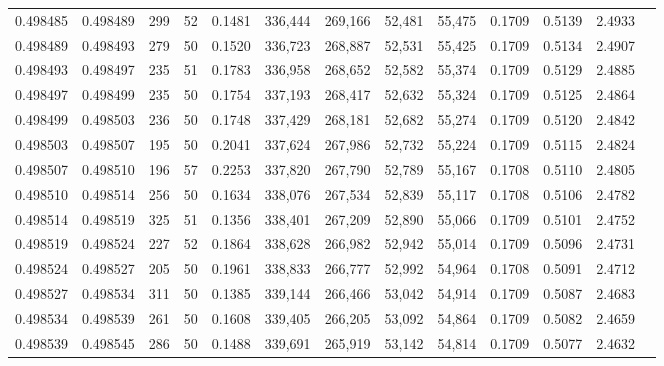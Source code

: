\begin{tabular}{rrrrrrrrrrrrr}
0.498485 & 0.498489 & 299 &  52 &                                     0.1481 & 336,444 & 269,166 &  52,481 &  55,475 & 0.1709 & 0.5139 & 2.4933 \\
0.498489 & 0.498493 & 279 &  50 &                                     0.1520 & 336,723 & 268,887 &  52,531 &  55,425 & 0.1709 & 0.5134 & 2.4907 \\
0.498493 & 0.498497 & 235 &  51 &                                     0.1783 & 336,958 & 268,652 &  52,582 &  55,374 & 0.1709 & 0.5129 & 2.4885 \\
0.498497 & 0.498499 & 235 &  50 &                                     0.1754 & 337,193 & 268,417 &  52,632 &  55,324 & 0.1709 & 0.5125 & 2.4864 \\
0.498499 & 0.498503 & 236 &  50 &                                     0.1748 & 337,429 & 268,181 &  52,682 &  55,274 & 0.1709 & 0.5120 & 2.4842 \\
0.498503 & 0.498507 & 195 &  50 &                                     0.2041 & 337,624 & 267,986 &  52,732 &  55,224 & 0.1709 & 0.5115 & 2.4824 \\
0.498507 & 0.498510 & 196 &  57 &                                     0.2253 & 337,820 & 267,790 &  52,789 &  55,167 & 0.1708 & 0.5110 & 2.4805 \\
0.498510 & 0.498514 & 256 &  50 &                                     0.1634 & 338,076 & 267,534 &  52,839 &  55,117 & 0.1708 & 0.5106 & 2.4782 \\
0.498514 & 0.498519 & 325 &  51 &                                     0.1356 & 338,401 & 267,209 &  52,890 &  55,066 & 0.1709 & 0.5101 & 2.4752 \\
0.498519 & 0.498524 & 227 &  52 &                                     0.1864 & 338,628 & 266,982 &  52,942 &  55,014 & 0.1709 & 0.5096 & 2.4731 \\
0.498524 & 0.498527 & 205 &  50 &                                     0.1961 & 338,833 & 266,777 &  52,992 &  54,964 & 0.1708 & 0.5091 & 2.4712 \\
0.498527 & 0.498534 & 311 &  50 &                                     0.1385 & 339,144 & 266,466 &  53,042 &  54,914 & 0.1709 & 0.5087 & 2.4683 \\
0.498534 & 0.498539 & 261 &  50 &                                     0.1608 & 339,405 & 266,205 &  53,092 &  54,864 & 0.1709 & 0.5082 & 2.4659 \\
0.498539 & 0.498545 & 286 &  50 &                                     0.1488 & 339,691 & 265,919 &  53,142 &  54,814 & 0.1709 & 0.5077 & 2.4632 \\

\end{tabular}
